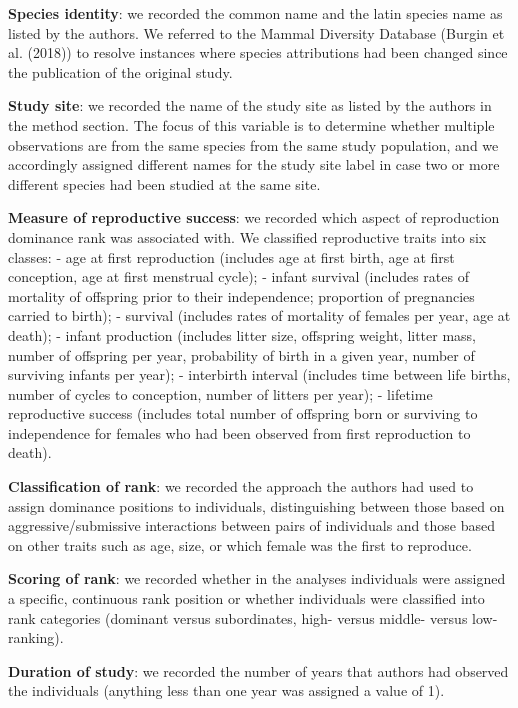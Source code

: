 \documentclass[
]{article}
\begin{document}
\textbf{Species identity}: we recorded the common name and the latin
species name as listed by the authors. We referred to the Mammal
Diversity Database (Burgin et al. (2018)) to resolve instances where
species attributions had been changed since the publication of the
original study.

\textbf{Study site}: we recorded the name of the study site as listed by
the authors in the method section. The focus of this variable is to
determine whether multiple observations are from the same species from
the same study population, and we accordingly assigned different names
for the study site label in case two or more different species had been
studied at the same site.

\textbf{Measure of reproductive success}: we recorded which aspect of
reproduction dominance rank was associated with. We classified
reproductive traits into six classes: - age at first reproduction
(includes age at first birth, age at first conception, age at first
menstrual cycle); - infant survival (includes rates of mortality of
offspring prior to their independence; proportion of pregnancies carried
to birth); - survival (includes rates of mortality of females per year,
age at death); - infant production (includes litter size, offspring
weight, litter mass, number of offspring per year, probability of birth
in a given year, number of surviving infants per year); - interbirth
interval (includes time between life births, number of cycles to
conception, number of litters per year); - lifetime reproductive success
(includes total number of offspring born or surviving to independence
for females who had been observed from first reproduction to death).

\textbf{Classification of rank}: we recorded the approach the authors
had used to assign dominance positions to individuals, distinguishing
between those based on aggressive/submissive interactions between pairs
of individuals and those based on other traits such as age, size, or
which female was the first to reproduce.

\textbf{Scoring of rank}: we recorded whether in the analyses
individuals were assigned a specific, continuous rank position or
whether individuals were classified into rank categories (dominant
versus subordinates, high- versus middle- versus low-ranking).

\textbf{Duration of study}: we recorded the number of years that authors
had observed the individuals (anything less than one year was assigned a
value of 1).
\end{document}
